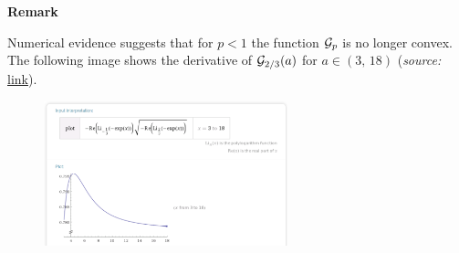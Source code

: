 \documentclass{article}
\begin{document}
\textbf{Remark}

Numerical evidence suggests that for $p<1$ the function $\mathcal G_p$ is no longer convex. The following image shows the derivative of $\mathcal G_{2/3}(a)$ for $a\in(3,\,18)$ (\textit{source:} \href{http://www.wolframalpha.com/input/?i=Plot%
}{link}).
\begin{figure}[h]
	\includegraphics[width=200pt]{polylog_G_less_1}
\end{figure}
\end{document}
